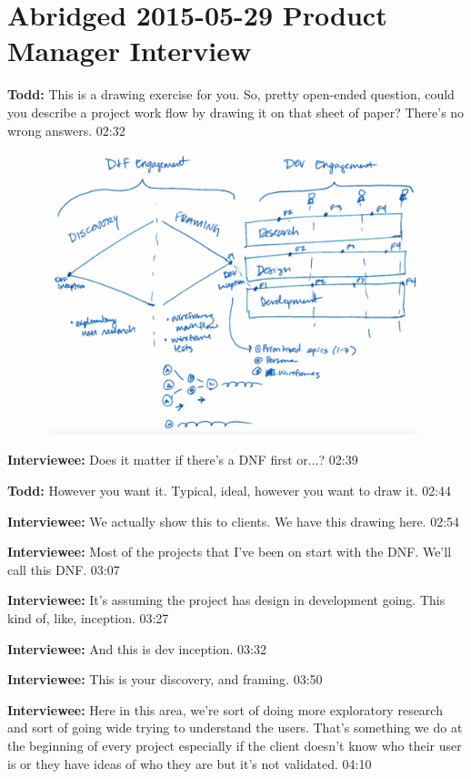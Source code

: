 \section{Abridged 2015-05-29 Product Manager Interview}

\textbf{Todd:} This is a drawing exercise for you. So, pretty open-ended question, could you describe a project work flow by drawing it on that sheet of paper? There's no wrong answers. 02:32

\begin{figure}[h]
\centering
\includegraphics[width=6.5in]{interviews/drawings/2015_05_29.png}
\caption{}
\label{2015_05_29}
\end{figure}

\textbf{Interviewee:} Does it matter if there's a DNF first or...? 02:39

\textbf{Todd:} However you want it. Typical, ideal, however you want to draw it. 02:44

\textbf{Interviewee:} We actually show this to clients. We have this drawing here. 02:54

\textbf{Interviewee:} Most of the projects that I've been on start with the DNF. We'll call this DNF. 03:07

\textbf{Interviewee:} It's assuming the project has design in development going. This kind of, like, inception. 03:27

\textbf{Interviewee:} And this is dev inception. 03:32

\textbf{Interviewee:} This is your discovery, and framing. 03:50

\textbf{Interviewee:} Here in this area, we're sort of doing more exploratory research and sort of going wide trying to understand the users. That's something we do at the beginning of every project especially if the client doesn't know who their user is or they have ideas of who they are but it's not validated. 04:10

